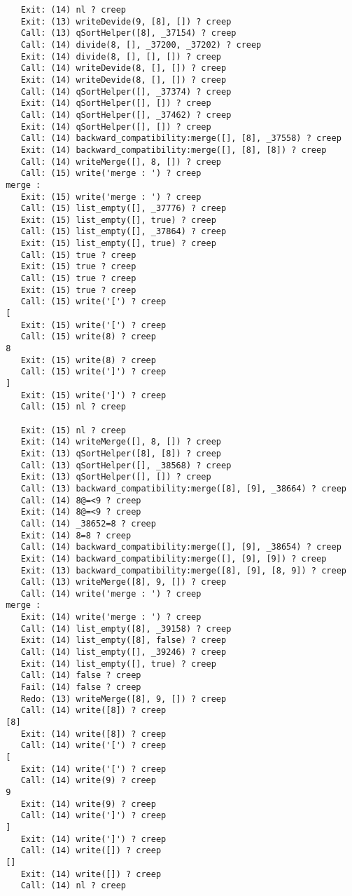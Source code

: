\documentclass{article}
\begin{document}
\begin{lstlisting}
	Exit: (14) nl ? creep
	Exit: (13) writeDevide(9, [8], []) ? creep
	Call: (13) qSortHelper([8], _37154) ? creep
	Call: (14) divide(8, [], _37200, _37202) ? creep
	Exit: (14) divide(8, [], [], []) ? creep
	Call: (14) writeDevide(8, [], []) ? creep
	Exit: (14) writeDevide(8, [], []) ? creep
	Call: (14) qSortHelper([], _37374) ? creep
	Exit: (14) qSortHelper([], []) ? creep
	Call: (14) qSortHelper([], _37462) ? creep
	Exit: (14) qSortHelper([], []) ? creep
	Call: (14) backward_compatibility:merge([], [8], _37558) ? creep
	Exit: (14) backward_compatibility:merge([], [8], [8]) ? creep
	Call: (14) writeMerge([], 8, []) ? creep
	Call: (15) write('merge : ') ? creep
 merge :
	Exit: (15) write('merge : ') ? creep
	Call: (15) list_empty([], _37776) ? creep
	Exit: (15) list_empty([], true) ? creep
	Call: (15) list_empty([], _37864) ? creep
	Exit: (15) list_empty([], true) ? creep
	Call: (15) true ? creep
	Exit: (15) true ? creep
	Call: (15) true ? creep
	Exit: (15) true ? creep
	Call: (15) write('[') ? creep
 [
	Exit: (15) write('[') ? creep
	Call: (15) write(8) ? creep
 8
	Exit: (15) write(8) ? creep
	Call: (15) write(']') ? creep
 ]
	Exit: (15) write(']') ? creep
	Call: (15) nl ? creep
 
	Exit: (15) nl ? creep
	Exit: (14) writeMerge([], 8, []) ? creep
	Exit: (13) qSortHelper([8], [8]) ? creep
	Call: (13) qSortHelper([], _38568) ? creep
	Exit: (13) qSortHelper([], []) ? creep
	Call: (13) backward_compatibility:merge([8], [9], _38664) ? creep
	Call: (14) 8@=<9 ? creep
	Exit: (14) 8@=<9 ? creep
	Call: (14) _38652=8 ? creep
	Exit: (14) 8=8 ? creep
	Call: (14) backward_compatibility:merge([], [9], _38654) ? creep
	Exit: (14) backward_compatibility:merge([], [9], [9]) ? creep
	Exit: (13) backward_compatibility:merge([8], [9], [8, 9]) ? creep
	Call: (13) writeMerge([8], 9, []) ? creep
	Call: (14) write('merge : ') ? creep
 merge :
	Exit: (14) write('merge : ') ? creep
	Call: (14) list_empty([8], _39158) ? creep
	Exit: (14) list_empty([8], false) ? creep
	Call: (14) list_empty([], _39246) ? creep
	Exit: (14) list_empty([], true) ? creep
	Call: (14) false ? creep
	Fail: (14) false ? creep
	Redo: (13) writeMerge([8], 9, []) ? creep
	Call: (14) write([8]) ? creep
 [8]
	Exit: (14) write([8]) ? creep
	Call: (14) write('[') ? creep
 [
	Exit: (14) write('[') ? creep
	Call: (14) write(9) ? creep
 9
	Exit: (14) write(9) ? creep
	Call: (14) write(']') ? creep
 ]
	Exit: (14) write(']') ? creep
	Call: (14) write([]) ? creep
 []
	Exit: (14) write([]) ? creep
	Call: (14) nl ? creep
 

\end{lstlisting}
\end{document}

